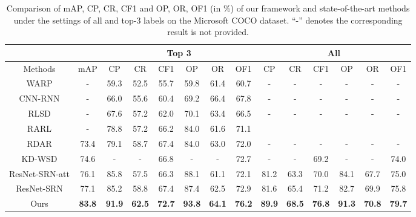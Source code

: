 \documentclass[10pt,twocolumn,letterpaper]{article}
\begin{document}
\begin{table*}[!t]
\centering
\begin{tabular}{c|c|cccccc|cccccc}
\hline
&  & \multicolumn{6}{c|}{Top 3} &\multicolumn{6}{c}{All} \\
\hline
\centering  Methods & mAP & CP & CR & CF1 & OP & OR & OF1  & CP & CR & CF1 & OP & OR & OF1 \\
\hline
\hline
WARP \cite{gong2013deep}   &- & 59.3 & 52.5 & 55.7 & 59.8 & 61.4 & 60.7 & - & - & -&-  & -&- \\
CNN-RNN \cite{wang2016cnn} &- & 66.0 & 55.6 & 60.4 & 69.2 & 66.4 & 67.8 &- & - & -&-  & -&-\\
RLSD \cite{zhang2018multi} &- & 67.6 & 57.2 & 62.0 & 70.1 & 63.4 & 66.5 &- & - & -&-  & -&-\\
RARL \cite{chen2018recurrent} & - & 78.8 & 57.2 & 66.2 & 84.0 & 61.6 & 71.1 & \\
RDAR \cite{wang2017multi} & 73.4 & 79.1 &  58.7 & 67.4 & 84.0 & 63.0 & 72.0 &- & - & -&-  & -&-\\
KD-WSD \cite{DBLP:conf/mm/LiuSSYXP18}& 74.6 & - & -& 66.8 & - &- &72.7  &- &-& 69.2 & - & -&74.0 \\
ResNet-SRN-att \cite{zhu2017learning} & 76.1 & 85.8 & 57.5 & 66.3 & 88.1 & 61.1 & 72.1 & 81.2 & 63.3 & 70.0 & 84.1 & 67.7 & 75.0\\
ResNet-SRN \cite{zhu2017learning} & 77.1 & 85.2 & 58.8 & 67.4 & 87.4 & 62.5 & 72.9 & 81.6 & 65.4 & 71.2 & 82.7 & 69.9 & 75.8 \\
\hline
Ours & \textbf{83.8} & \textbf{91.9} & \textbf{62.5} & \textbf{72.7} & \textbf{93.8} & \textbf{64.1} & \textbf{76.2} & \textbf{89.9} & \textbf{68.5} & \textbf{76.8} & \textbf{91.3} & \textbf{70.8} & \textbf{79.7}\\
\hline
\end{tabular}
\caption{Comparison of mAP, CP, CR, CF1 and OP, OR, OF1 (in \%) of our framework and state-of-the-art methods under the settings of all and top-3 labels on the Microsoft COCO dataset. ``-'' denotes the corresponding result is not provided.}
\vspace{-10pt}
\label{table:result-coco}
\end{table*}
\end{document}
